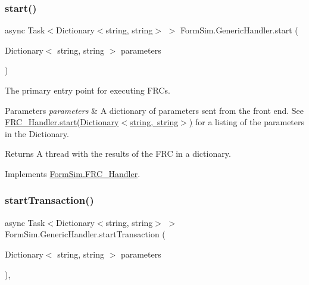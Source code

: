 \subsubsection{\texorpdfstring{start()}{start()}}
{\footnotesize\ttfamily async Task$<$Dictionary$<$string, string$>$ $>$ Form\+Sim.\+Generic\+Handler.\+start (\begin{DoxyParamCaption}\item[{Dictionary$<$ string, string $>$}]{parameters }\end{DoxyParamCaption})\hspace{0.3cm}{\ttfamily [inline]}}



The primary entry point for executing F\+R\+Cs. 


\begin{DoxyParams}{Parameters}
{\em parameters} & A dictionary of parameters sent from the front end. See \mbox{\hyperlink{interface_form_sim_1_1_f_r_c___handler_a2a2a8a776e774e5f8b5e2b7e623a26a6}{F\+R\+C\+\_\+\+Handler.\+start(\+Dictionary$<$string, string$>$)}} for a listing of the parameters in the Dictionary.\\
\hline
\end{DoxyParams}
\begin{DoxyReturn}{Returns}
A thread with the results of the F\+RC in a dictionary.
\end{DoxyReturn}


Implements \mbox{\hyperlink{interface_form_sim_1_1_f_r_c___handler_a2a2a8a776e774e5f8b5e2b7e623a26a6}{Form\+Sim.\+F\+R\+C\+\_\+\+Handler}}.

\mbox{\label{class_form_sim_1_1_generic_handler_a8cb06afb7f6aed51488c7418491b9dd3}} 
\subsubsection{\texorpdfstring{start\+Transaction()}{startTransaction()}}
{\footnotesize\ttfamily async Task$<$Dictionary$<$string, string$>$ $>$ Form\+Sim.\+Generic\+Handler.\+start\+Transaction (\begin{DoxyParamCaption}\item[{Dictionary$<$ string, string $>$}]{parameters }\end{DoxyParamCaption})\hspace{0.3cm}{\ttfamily [inline]}, {\ttfamily [protected]}}



